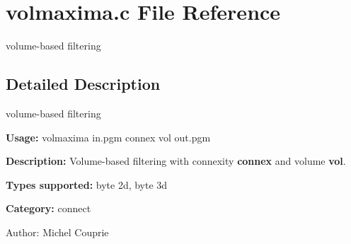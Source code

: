 \section{volmaxima.c File Reference}
\label{volmaxima_8c}
volume-based filtering 



\subsection{Detailed Description}
volume-based filtering 

{\bf Usage:} volmaxima in.pgm connex vol out.pgm

{\bf Description:} Volume-based filtering with connexity {\bf connex} and volume {\bf vol}.

{\bf Types supported:} byte 2d, byte 3d

{\bf Category:} connect

\begin{Desc}
\item[Author:]Michel Couprie \end{Desc}
